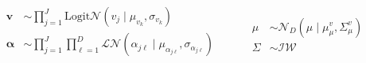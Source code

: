\begin{equation}
    \begin{aligned}
        \bm{v} &\sim {\textstyle\prod}_{j = 1}^J \text{Logit}\mathcal{N}(v_j\mid\mu_{v_k},\sigma_{v_k})\\
        \bm{\alpha} &\sim  {\textstyle\prod}_{j = 1}^J{\textstyle\prod}_{\ell = 1}^D\mathcal{LN}(\alpha_{j\ell}\mid\mu_{\alpha_{j\ell}},\sigma_{\alpha_{j\ell}})\\        
    \end{aligned}
    ~\hspace{1cm}
    \begin{aligned}
        \mu &\sim \mathcal{N}_D(\mu\mid\mu_{\mu}^v,\Sigma_{\mu}^v)\\
        \Sigma &\sim \mathcal{IW}
    \end{aligned}
\end{equation}








